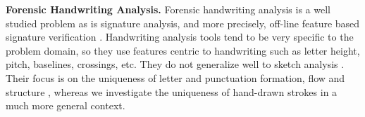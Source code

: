 \noindent\textbf{Forensic Handwriting Analysis.}
Forensic handwriting analysis is a well studied problem \cite{srisurvey03} as is signature analysis, and more precisely, off-line feature based signature verification \cite{4603099,Kovari2013247}. Handwriting analysis tools tend to be very specific to the problem domain, so they use features centric to handwriting such as letter height, pitch, baselines, crossings, etc. They do not generalize well to sketch analysis \cite{1263248}. Their focus is on the uniqueness of letter and punctuation formation, flow and structure \cite{handwriting2001}, whereas we investigate the uniqueness of hand-drawn strokes in a much more general context.


